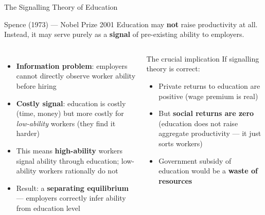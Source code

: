 \documentclass[aspectratio=169, 12pt]{beamer}
\begin{document}
\begin{frame}{The Signalling Theory of Education}
  \begin{block}{Spence (1973) --- Nobel Prize 2001}
    Education may \textbf{not} raise productivity at all. Instead, it may serve purely as a
    \textbf{signal} of pre-existing ability to employers.
  \end{block}
  \vspace{0.3em}
  \begin{columns}
      \begin{itemize}
        \item \textbf{Information problem}: employers cannot directly observe worker ability
              before hiring
        \item \textbf{Costly signal}: education is costly (time, money) but more costly for
              \emph{low-ability} workers (they find it harder)
        \item This means \textbf{high-ability} workers signal ability through education;
              low-ability workers rationally do not
        \item Result: a \textbf{separating equilibrium} --- employers correctly infer ability
              from education level
      \end{itemize}
      \begin{alertblock}{The crucial implication}
        If signalling theory is correct:
        \begin{itemize}
          \item Private returns to education are positive (wage premium is real)
          \item But \textbf{social returns are zero} (education does not raise aggregate
                productivity --- it just sorts workers)
          \item Government subsidy of education would be a \textbf{waste of resources}
        \end{itemize}
      \end{alertblock}
  \end{columns}
\end{frame}
\end{document}
